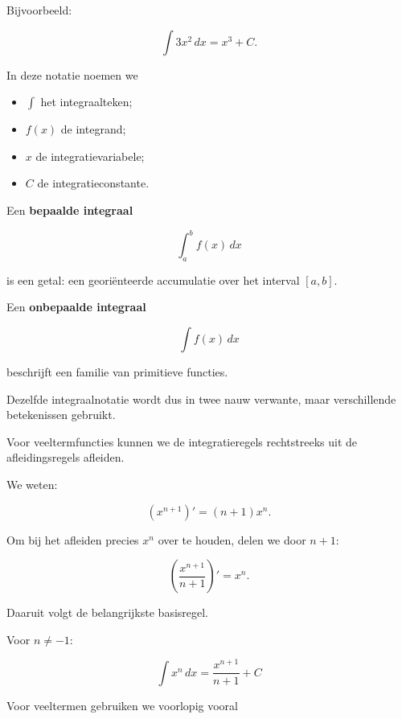 \documentclass{ximera}
\begin{document}
Bijvoorbeeld:

\[
\int 3x^2\,dx=x^3+C.
\]

In deze notatie noemen we

\begin{itemize}
    \item \(\int\) het integraalteken;
    \item \(f(x)\) de integrand;
    \item \(x\) de integratievariabele;
    \item \(C\) de integratieconstante.
\end{itemize}

\begin{opmerking}
Een \textbf{bepaalde integraal}

\[
\int_a^b f(x)\,dx
\]

is een getal: een georiënteerde accumulatie over het interval
\([a,b]\).

Een \textbf{onbepaalde integraal}

\[
\int f(x)\,dx
\]

beschrijft een familie van primitieve functies.

Dezelfde integraalnotatie wordt dus in twee nauw verwante, maar
verschillende betekenissen gebruikt.
\end{opmerking}



Voor veeltermfuncties kunnen we de integratieregels rechtstreeks uit de
afleidingsregels afleiden.

We weten:

\[
\left(x^{n+1}\right)'=(n+1)x^n.
\]

Om bij het afleiden precies \(x^n\) over te houden, delen we door
\(n+1\):

\[
\left(\frac{x^{n+1}}{n+1}\right)'=x^n.
\]

Daaruit volgt de belangrijkste basisregel.

\begin{eigenschap}[Machtsregel]
Voor \(n\neq -1\):

\[
\boxed{
\int x^n\,dx
=
\frac{x^{n+1}}{n+1}+C
}
\]
\end{eigenschap}

Voor veeltermen gebruiken we voorlopig vooral
\end{document}
